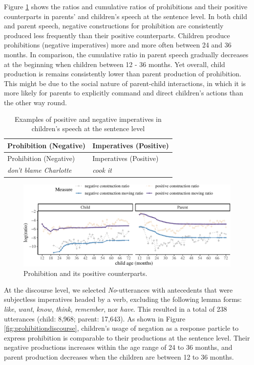 \documentclass[
  english,
  man,floatsintext]{apa6}
\begin{document}
Figure \ref{fig:prohibition} shows the ratios and cumulative ratios of prohibitions and their positive counterparts in parents' and children's speech at the sentence level. In both child and parent speech, negative constructions for prohibition are consistently produced less frequently than their positive counterparts. Children produce prohibitions (negative imperatives) more and more often between 24 and 36 months. In comparison, the cumulative ratio in parent speech gradually decreases at the beginning when children between 12 - 36 months. Yet overall, child production is remains consistently lower than parent production of prohibition. This might be due to the social nature of parent-child interactions, in which it is more likely for parents to explicitly command and direct children's actions than the other way round.

\begin{longtable}[]{@{}ll@{}}
\caption{\label{tab:prohibit} Examples of positive and negative imperatives in children's speech at the sentence level}\tabularnewline
\toprule
Prohibition (Negative) & Imperatives (Positive) \\
\midrule
\endfirsthead
\toprule
Prohibition (Negative) & Imperatives (Positive) \\
\midrule
\endhead
\emph{don't blame Charlotte} & \emph{cook it} \\
\bottomrule
\end{longtable}

\begin{figure}[H]

{\centering \includegraphics{neg_construction_article_files/figure-latex/prohibition-1} 

}

\caption{Prohibition and its positive counterparts.}\label{fig:prohibition}
\end{figure}

At the discourse level, we selected \emph{No}-utterances with antecedents that were subjectless imperatives headed by a verb, excluding the following lemma forms: \emph{like}, \emph{want}, \emph{know}, \emph{think}, \emph{remember}, nor \emph{have}. This resulted in a total of 238 utterances (child: 8,968; parent: 17,643). As shown in Figure \ref{fig:prohibitiondiscourse}, children's usage of negation as a response particle to express prohibition is comparable to their productions at the sentence level. Their negative productions increases within the age range of 24 to 36 months, and parent production decreases when the children are between 12 to 36 months.
\end{document}
